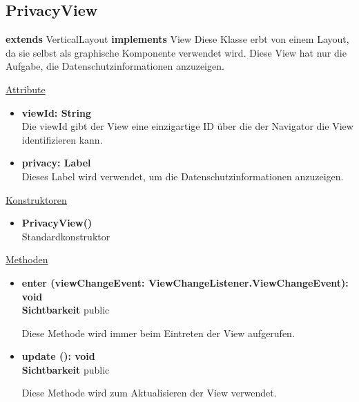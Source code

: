 \newpage
\subsection{PrivacyView}\label{PrivacyView}
\textbf{extends}  VerticalLayout \newline
\textbf{implements} View \newline
Diese Klasse erbt von einem Layout, da sie selbst als graphische Komponente verwendet wird. Diese View hat nur die Aufgabe, die Datenschutzinformationen anzuzeigen.
\newline

\underline{Attribute}
\begin{itemize}
\itemsep0pt
\item \textbf{viewId: String} \hfill\\ 
Die viewId gibt der View eine einzigartige ID über die der Navigator die View identifizieren kann.

\item \textbf{privacy: Label} \hfill\\ 
Dieses Label wird verwendet, um die Datenschutzinformationen anzuzeigen.

\end{itemize}

\underline{Konstruktoren}
\begin{itemize}
\itemsep0pt
\item \textbf{PrivacyView()} \hfill\\
Standardkonstruktor
\end{itemize}

\underline{Methoden}
\begin{itemize}
\itemsep0pt
\item \textbf{enter (viewChangeEvent: ViewChangeListener.ViewChangeEvent): void}\hfill\\
\textbf{Sichtbarkeit} public

Diese Methode wird immer beim Eintreten der View aufgerufen.

\item \textbf{update (): void}\hfill\\
\textbf{Sichtbarkeit} public

Diese Methode wird zum Aktualisieren der View verwendet.

\end{itemize}

